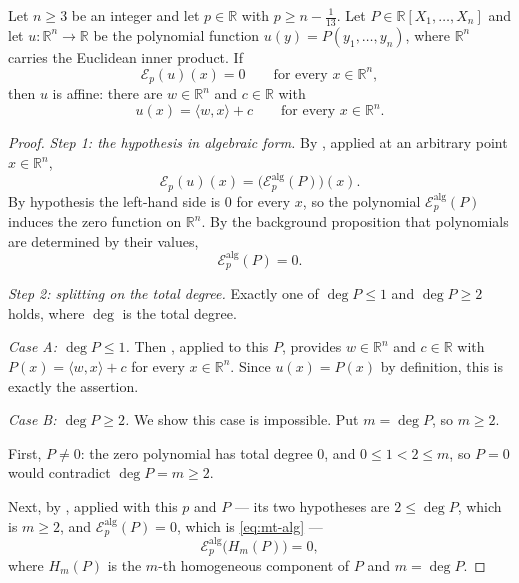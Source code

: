 \begin{theorem}
Let $n\ge3$ be an integer and let $p\in\mathbb{R}$ with $p\ge n-\tfrac1{13}$.
Let $P\in\mathbb{R}[X_1,\dots,X_n]$ and let $u:\mathbb{R}^n\to\mathbb{R}$ be the
polynomial function $u(y)=P(y_1,\dots,y_n)$, where $\mathbb{R}^n$ carries the
Euclidean inner product. If
\[
  \mathcal{E}_p(u)(x)=0\qquad\text{for every }x\in\mathbb{R}^n,
\]
then $u$ is affine: there are $w\in\mathbb{R}^n$ and $c\in\mathbb{R}$ with
\[
  u(x)=\langle w,x\rangle+c\qquad\text{for every }x\in\mathbb{R}^n .
\]
\end{theorem}
\begin{proof}
\emph{Step 1: the hypothesis in algebraic form.} By ,
applied at an arbitrary point $x\in\mathbb{R}^n$,
\[
  \mathcal{E}_p(u)(x)=\bigl(\mathcal{E}^{\mathrm{alg}}_p(P)\bigr)(x).
\]
By hypothesis the left-hand side is $0$ for every $x$, so the polynomial
$\mathcal{E}^{\mathrm{alg}}_p(P)$ induces the zero function on $\mathbb{R}^n$.
By the background proposition that polynomials are determined by their values,
\begin{equation}\label{eq:mt-alg}
  \mathcal{E}^{\mathrm{alg}}_p(P)=0 .
\end{equation}

\emph{Step 2: splitting on the total degree.} Exactly one of $\deg P\le1$ and
$\deg P\ge2$ holds, where $\deg$ is the total degree.

\emph{Case A: $\deg P\le1$.} Then , applied to
this $P$, provides $w\in\mathbb{R}^n$ and $c\in\mathbb{R}$ with
$P(x)=\langle w,x\rangle+c$ for every $x\in\mathbb{R}^n$. Since $u(x)=P(x)$ by
definition, this is exactly the assertion.

\emph{Case B: $\deg P\ge2$.} We show this case is impossible. Put
$m=\deg P$, so $m\ge2$.

First, $P\ne0$: the zero polynomial has total degree $0$, and $0\le1<2\le m$, so
$P=0$ would contradict $\deg P=m\ge2$.

Next, by , applied with this $p$ and $P$ --- its two
hypotheses are $2\le\deg P$, which is $m\ge2$, and
$\mathcal{E}^{\mathrm{alg}}_p(P)=0$, which is \eqref{eq:mt-alg} ---
\begin{equation}\label{eq:mt-top}
  \mathcal{E}^{\mathrm{alg}}_p\bigl(H_m(P)\bigr)=0 ,
\end{equation}
where $H_m(P)$ is the $m$-th homogeneous component of $P$ and $m=\deg P$.


\end{proof}
